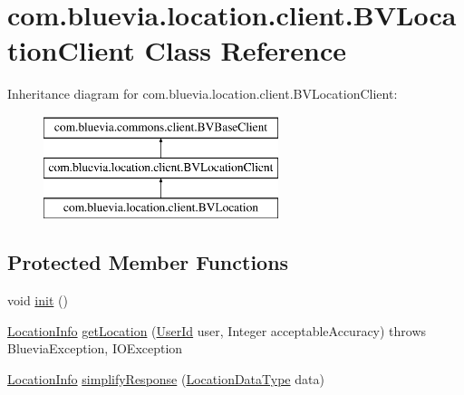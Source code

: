 \hypertarget{classcom_1_1bluevia_1_1location_1_1client_1_1BVLocationClient}{
\section{com.bluevia.location.client.BVLocationClient Class Reference}
\label{classcom_1_1bluevia_1_1location_1_1client_1_1BVLocationClient}
}
Inheritance diagram for com.bluevia.location.client.BVLocationClient:\begin{figure}[H]
\begin{center}
\leavevmode
\includegraphics[height=3.000000cm]{classcom_1_1bluevia_1_1location_1_1client_1_1BVLocationClient}
\end{center}
\end{figure}
\subsection*{Protected Member Functions}
\begin{DoxyCompactItemize}
\item 
void \hyperlink{classcom_1_1bluevia_1_1location_1_1client_1_1BVLocationClient_af3ded8f66c1e7361ac434da71b467cb5}{init} ()
\item 
\hyperlink{classcom_1_1bluevia_1_1location_1_1data_1_1LocationInfo}{LocationInfo} \hyperlink{classcom_1_1bluevia_1_1location_1_1client_1_1BVLocationClient_a29a4c3b6f3799e10f74deaed3f0a8d53}{getLocation} (\hyperlink{classcom_1_1bluevia_1_1commons_1_1data_1_1UserId}{UserId} user, Integer acceptableAccuracy)  throws BlueviaException, IOException 
\item 
\hyperlink{classcom_1_1bluevia_1_1location_1_1data_1_1LocationInfo}{LocationInfo} \hyperlink{classcom_1_1bluevia_1_1location_1_1client_1_1BVLocationClient_a0d7777cb2271b905320439aa9cbed940}{simplifyResponse} (\hyperlink{classcom_1_1telefonica_1_1schemas_1_1unica_1_1rest_1_1location_1_1v1_1_1LocationDataType}{LocationDataType} data)
\end{DoxyCompactItemize}
